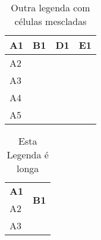 \documentclass{article}
\begin{document}
\renewcommand{\arraystretch}{2}
\begin{table}[H]
  \centering
  \label{tab:tab4}
  \begin{tabular}{|l|ll|ll|}
    \hline
    A1 & \multicolumn{2}{l|}{B1}  & \multicolumn{1}{l|}{D1}      & E1
    \\ \hline
    A2 & \multicolumn{1}{l|}{} &  &
    \multicolumn{2}{l|}{\multirow{2}{*}{}} \\ \cline{1-3}
    A3 & \multicolumn{1}{l|}{} &  & \multicolumn{2}{l|}{}
    \\ \hline
    A4 & \multicolumn{1}{l|}{} &  & \multicolumn{1}{l|}{}        &
    \\ \hline
    A5 & \multicolumn{1}{l|}{} &  & \multicolumn{1}{l|}{}        &
    \\ \hline
  \end{tabular}
  \caption[Legenda Maior]{Outra legenda com células mescladas}
\end{table}

\begin{table}[H]
  \centering
  \label{tab:tab5}
  \begin{tabularx}{0.5\textwidth}{|X|X|X|}
    \hline
    \textbf{A1} & \multicolumn{2}{c|}{\multirow{2}{*}{\textbf{B1}}} \\
    \cline{1-1}
    A2          & \multicolumn{2}{l|}{}                             \\ \hline
    A3          &                         &                         \\ \hline
  \end{tabularx}
  \caption[Legenda Curta]{Esta Legenda é longa}
\end{table}
\end{document}
